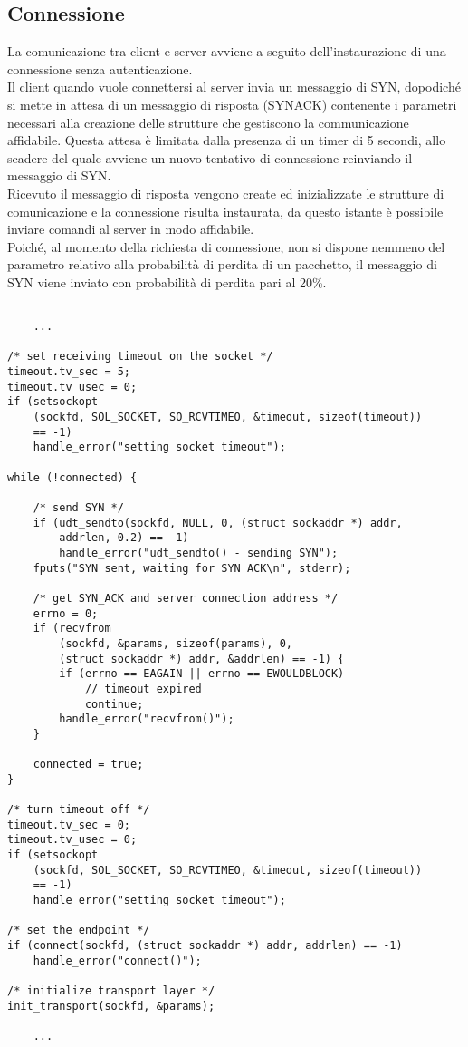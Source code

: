\subsection{Connessione}
La comunicazione tra client e server avviene a seguito dell'instaurazione di una connessione senza autenticazione.\\
Il client quando vuole connettersi al server invia un messaggio di SYN, dopodiché si mette in attesa di un messaggio di risposta (SYNACK) contenente i parametri necessari alla creazione delle strutture che gestiscono la communicazione affidabile. Questa attesa è limitata dalla presenza di un timer di 5 secondi, allo scadere del quale avviene un nuovo tentativo di connessione reinviando il messaggio di SYN.\\
Ricevuto il messaggio di risposta vengono create ed inizializzate le strutture di comunicazione e la connessione risulta instaurata, da questo istante è possibile inviare comandi al server in modo affidabile.\\
Poiché, al momento della richiesta di connessione, non si dispone nemmeno del parametro relativo alla probabilità di perdita di un pacchetto, il messaggio di SYN viene inviato con probabilità di perdita pari al 20\%.

\begin{lstlisting}[title=client:instaurazione della connessione]

	...

/* set receiving timeout on the socket */
timeout.tv_sec = 5;
timeout.tv_usec = 0;
if (setsockopt
	(sockfd, SOL_SOCKET, SO_RCVTIMEO, &timeout, sizeof(timeout))
	== -1)
	handle_error("setting socket timeout");

while (!connected) {

	/* send SYN */
	if (udt_sendto(sockfd, NULL, 0, (struct sockaddr *) addr, 
		addrlen, 0.2) == -1)
		handle_error("udt_sendto() - sending SYN");
	fputs("SYN sent, waiting for SYN ACK\n", stderr);

	/* get SYN_ACK and server connection address */
	errno = 0;
	if (recvfrom
		(sockfd, &params, sizeof(params), 0,
		(struct sockaddr *) addr, &addrlen) == -1) {
		if (errno == EAGAIN || errno == EWOULDBLOCK)
			// timeout expired
			continue;
		handle_error("recvfrom()");
	}

	connected = true;
}

/* turn timeout off */
timeout.tv_sec = 0;
timeout.tv_usec = 0;
if (setsockopt
	(sockfd, SOL_SOCKET, SO_RCVTIMEO, &timeout, sizeof(timeout)) 
	== -1)
	handle_error("setting socket timeout");

/* set the endpoint */
if (connect(sockfd, (struct sockaddr *) addr, addrlen) == -1)
	handle_error("connect()");

/* initialize transport layer */
init_transport(sockfd, &params);

	...

\end{lstlisting}


